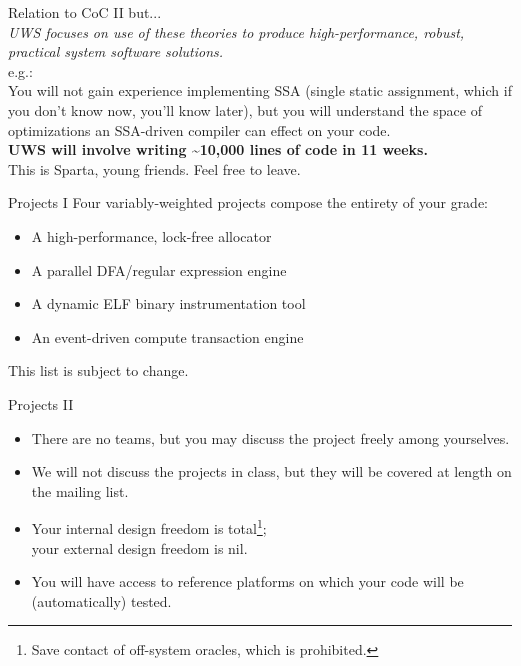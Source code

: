 \documentclass[handout]{beamer}
\begin{document}
\begin{frame}{Relation to CoC II}
but... \\
\emph{UWS focuses on {\it use} of these theories to produce high-performance,
robust, {\it practical} system software solutions.}\linebreak \\
e.g.: \\
You will not gain experience implementing SSA (single static
assignment, which if you don't know now, you'll know later), but you will
understand the space of optimizations an SSA-driven compiler can effect on your
code.\linebreak \\
{\bf UWS will involve writing \~{}10,000 lines of code in 11 weeks.}\linebreak \\
This is Sparta, young friends. Feel free to leave.
\end{frame}

\begin{frame}{Projects I}
Four variably-weighted projects compose the entirety of your grade:
\vspace{.25in}
\begin{itemize}
\item A high-performance, lock-free allocator
\item A parallel DFA/regular expression engine
\item A dynamic ELF binary instrumentation tool
\item An event-driven compute transaction engine
\end{itemize}
\vspace{.25in}
This list is subject to change.
\end{frame}

\begin{frame}{Projects II}
\begin{itemize}
\item There are no teams, but you may discuss the project freely among
	yourselves.
\item We will not discuss the projects in class, but they will be
	covered at length on the mailing list.
\item Your internal design freedom is total\footnote{Save contact of off-system oracles, which is prohibited.};\\
your external design freedom is nil.
\item You will have access to reference platforms on which your code will be
	(automatically) tested.
\end{itemize}
\end{frame}
\end{document}
